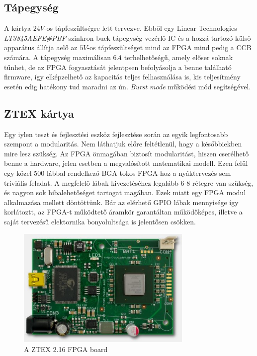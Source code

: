 
\subsection{Tápegység}
A kártya $24 V$-os tápfeszültségre lett tervezve. Ebből egy Linear Technologies \emph{LT3845AEFE#PBF} szinkron buck tápegység vezérlő IC és a hozzá tartozó külső apparátus állítja aelő az $5 V$-os tápfeszültséget mind az FPGA mind pedig a CCB számára. A tápegység maximálisan $6 A$ terhelhetőségű, amely előser soknak tűnhet, de az FPGA fogyasztását jelentpsen befolyásolja a benne található firmware, így elképzelhető az kapacitás teljes felhasználása is, kis teljesítmény esetén edig hatékony tud maradni az ún. \emph{Burst mode} működési mód segítségével.

\subsection{ZTEX kártya}

Egy iylen teszt és fejlesztési eszköz fejlesztése során az egyik legfontosabb szempont a modularitás. Nem láthatjuk előre feltétlenül, hogy a későbbiekben mire lesz szükség. Az FPGA önmagában biztosít modularitást, hiszen cserélhető benne a hardware, jelen esetben a megvalósított matematikai modell. Ezen felül egy közel 500 lábbal rendelkező BGA tokos FPGA-hoz a nyáktervezés sem triviális feladat. A megfelelő lábak kivezetéséhez legalább 6-8 rétegre van szükség, és nagyon sok hibalehetőséget tartogat magában. Ezek miatt egy FPGA modul alkalmazása mellett döntöttünk. Bár az elérhető GPIO lábak mennyisége így korlátoztt, az FPGA-t működtető áramkör garantáltan működőképes, illetve a saját tervezésű elektornika bonyolultsága is jelentősen csökken.

\begin{figure}[!ht]
	\centering
	\includegraphics[width = 0.75\textwidth]{figures/fpga216.jpg}
	\caption{A ZTEX 2.16 FPGA board} 
	\label{fig:ztex}
\end{figure}


